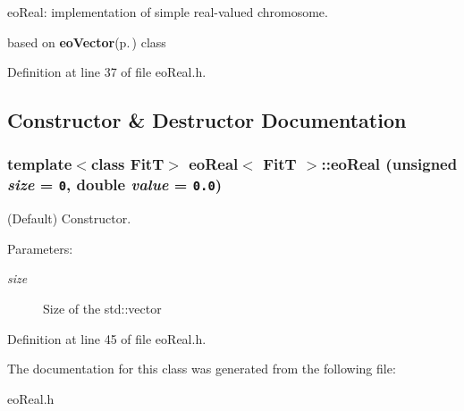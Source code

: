 eo\-Real: implementation of simple real-valued chromosome. 

based on {\bf eo\-Vector}{\rm (p.\,\pageref{classeo_vector})} class 



Definition at line 37 of file eo\-Real.h.

\subsection{Constructor \& Destructor Documentation}
\subsubsection{\setlength{\rightskip}{0pt plus 5cm}template$<$class Fit\-T$>$ {\bf eo\-Real}$<$ {\bf Fit\-T} $>$::{\bf eo\-Real} (unsigned {\em size} = {\tt 0}, double {\em value} = {\tt 0.0})\hspace{0.3cm}{\tt  [inline]}}\label{classeo_real_a0}


(Default) Constructor. 

\begin{Desc}
\item[Parameters:]
\begin{description}
\item[{\em size}]Size of the std::vector \end{description}
\end{Desc}


Definition at line 45 of file eo\-Real.h.

The documentation for this class was generated from the following file:\begin{CompactItemize}
\item 
eo\-Real.h\end{CompactItemize}
